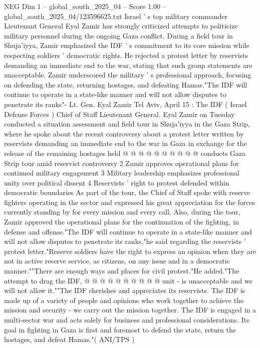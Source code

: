 \begin{textsample}{NEG Dim 1 – global\_south\_2025\_04 – Score 1.00 – global\_south\_2025\_04/123596625.txt}  \label{ex:f1_neg_160}
Israel ' s top military commander Lieutenant General Eyal Zamir has strongly criticized attempts to politicize military personnel during the ongoing Gaza conflict.
During a field tour in Shuja'iyya, Zamir emphasized the IDF ' s commitment to its core mission while respecting soldiers ' democratic rights.
He rejected a protest letter by reservists demanding an immediate end to the war, stating that such group statements are unacceptable.
Zamir underscored the military ' s professional approach, focusing on defending the state, returning hostages, and defeating Hamas."The IDF will continue to operate in a state-like manner and will not allow disputes to penetrate its ranks"- Lt.
Gen.
Eyal Zamir Tel Aviv, April 15 : The IDF ( Israel Defense Forces ) Chief of Staff Lieutenant General.
Eyal Zamir on Tuesday conducted a situation assessment and field tour in Shuja'iyya in the Gaza Strip, where he spoke about the recent controversy about a protest letter written by reservists demanding an immediate end to the war in Gaza in exchange for the release of the remaining hostages held @ @ @ @ @ @ @ @ @ @ conducts Gaza Strip tour amid reservist controversy 2 Zamir approves operational plans for continued military engagement 3 Military leadership emphasizes professional unity over political dissent 4 Reservists ' right to protest defended within democratic boundaries As part of the tour, the Chief of Staff spoke with reserve fighters operating in the sector and expressed his great appreciation for the forces currently standing by for every mission and every call.
Also, during the tour, Zamir approved the operational plans for the continuation of the fighting, in defense and offense."The IDF will continue to operate in a state-like manner and will not allow disputes to penetrate its ranks,"he said regarding the reservists ' protest letter."Reserve soldiers have the right to express an opinion when they are not in active reserve service, as citizens, on any issue and in a democratic manner.""There are enough ways and places for civil protest."He added."The attempt to drag the IDF, @ @ @ @ @ @ @ @ @ @ unit - is unacceptable and we will not allow it.""The IDF cherishes and appreciates its reservists.
The IDF is made up of a variety of people and opinions who work together to achieve the mission and security - we carry out the mission together.
The IDF is engaged in a multi-sector war and acts solely for business and professional considerations.
Its goal in fighting in Gaza is first and foremost to defend the state, return the hostages, and defeat Hamas."( ANI/TPS )

\end{textsample}
